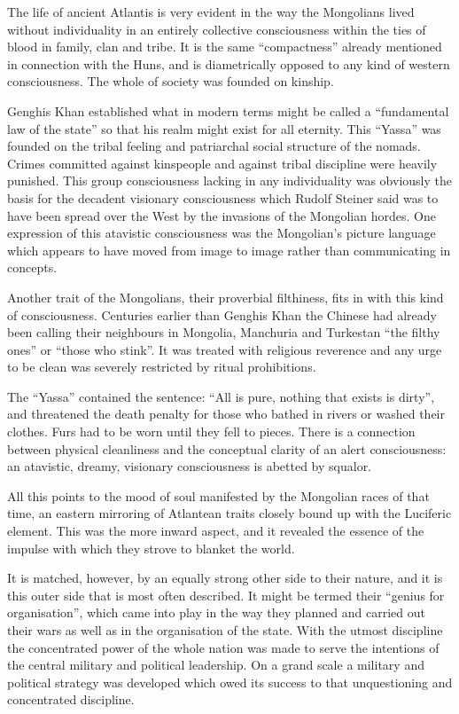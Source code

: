 The life of ancient Atlantis is very evident in the way the Mongolians lived without individuality in an entirely collective consciousness within the ties of blood in family, clan and tribe. It is the same ``compactness'' already mentioned in connection with the Huns, and is diametrically opposed to any kind of western consciousness. The whole of society was founded on kinship.

Genghis Khan established what in modern terms might be called a ``fundamental law of the state'' so that his realm might exist for all eternity. This ``Yassa'' was founded on the tribal feeling and patriarchal social structure of the nomads. Crimes committed against kinspeople and against tribal discipline were heavily punished. This group consciousness lacking in any individuality was obviously the basis for the decadent visionary consciousness which Rudolf Steiner said was to have been spread over the West by the invasions of the Mongolian hordes. One expression of this atavistic consciousness was the Mongolian's picture language which appears to have moved from image to image rather than communicating in concepts.

Another trait of the Mongolians, their proverbial filthiness, fits in with this kind of consciousness. Centuries earlier than Genghis Khan the Chinese had already been calling their neighbours in Mongolia, Manchuria and Turkestan ``the filthy ones'' or ``those who stink''. It was treated with religious reverence and any urge to be clean was severely restricted by ritual prohibitions.

The ``Yassa'' contained the sentence: ``All is pure, nothing that exists is dirty'', and threatened the death penalty for those who bathed in rivers or washed their clothes. Furs had to be worn until they fell to pieces. There is a connection between physical cleanliness and the conceptual clarity of an alert consciousness: an atavistic, dreamy, visionary consciousness is abetted by squalor.

All this points to the mood of soul manifested by the Mongolian races of that time, an eastern mirroring of Atlantean traits closely bound up with the Luciferic element. This was the more inward aspect, and it revealed the essence of the impulse with which they strove to blanket the world.

It is matched, however, by an equally strong other side to their nature, and it is this outer side that is most often described. It might be termed their ``genius for organisation'', which came into play in the way they planned and carried out their wars as well as in the organisation of the state. With the utmost discipline the concentrated power of the whole nation was made to serve the intentions of the central military and political leadership. On a grand scale a military and political strategy was developed which owed its success to that unquestioning and concentrated discipline.

